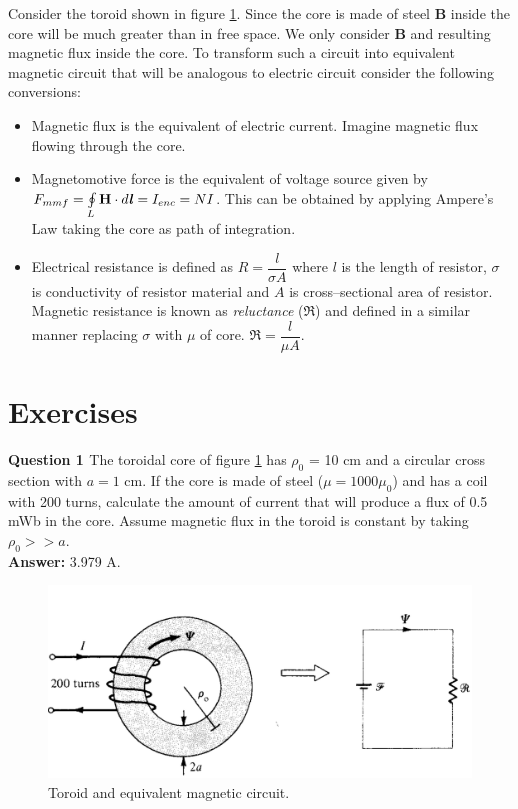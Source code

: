 \documentclass[12pt,a4paper]{article}
\begin{document}
Consider the toroid shown in figure \ref{Toroid-and-equivalent-circuit}. Since the core is made of steel \textbf{B} inside the core will be much greater than in free space. We only consider \textbf{B} and resulting magnetic flux inside the core. To transform such a circuit into equivalent magnetic circuit that will be analogous to electric circuit consider the following conversions:
\begin{itemize}
\item Magnetic flux is the equivalent of electric current. Imagine magnetic flux flowing through the core.
\item Magnetomotive force is the equivalent of voltage source given by $F_{mmf}=\oint\limits_{L} \textbf{H}\cdot d\textbf{\textit{l}}=I_{enc}=NI$. This can be obtained by applying Ampere's Law taking the core as path of integration.
\item Electrical resistance is defined as $R=\dfrac{l}{\sigma A}$ where $l$ is the length of resistor, $\sigma$ is conductivity of resistor material and $A$ is cross--sectional area of resistor. Magnetic resistance is known as \textit{reluctance} ($\Re$) and defined in a similar manner replacing $\sigma$ with $\mu$ of core. $\Re=\dfrac{l}{\mu A}$.
\end{itemize}
\section{Exercises}
\noindent\textbf{Question 1 \cite[Example 8.14, page 350]{Sadiku}} The toroidal core of figure \ref{Toroid-and-equivalent-circuit} has $\rho_0$ = 10 cm and a circular cross section with $a=1$ cm. If the core is made of steel ($\mu = 1000\mu_0$) and has a coil with 200 turns, calculate the amount of current that will produce a flux of 0.5 mWb in the core. Assume magnetic flux in the toroid is constant by taking $\rho_0>>a$.\\
\textbf{Answer:} 3.979 A.
\begin{figure}[H]
\centering
\includegraphics[scale=0.4]{Figure8-26S.png}
\caption{Toroid and equivalent magnetic circuit.}
\label{Toroid-and-equivalent-circuit}
\end{figure}


\end{document}
